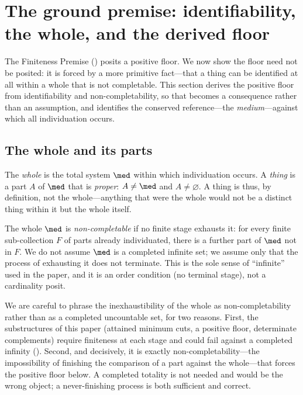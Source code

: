 
\section{The ground premise: identifiability, the whole, and the derived floor}
\label{sec:ground}

The Finiteness Premise () posits a positive floor. We now show
the floor need not be posited: it is forced by a more primitive fact---that a
thing can be identified at all within a whole that is not completable. This
section derives the positive floor from identifiability and non-completability,
so that  becomes a consequence rather than an assumption, and
identifies the conserved reference---the \emph{medium}---against which all
individuation occurs.

\subsection{The whole and its parts}

\begin{definition}
\label{def:whole}
The \emph{whole} is the total system $\med$ within which individuation occurs.
A \emph{thing} is a part $A$ of $\med$ that is \emph{proper}: $A\neq\med$ and
$A\neq\varnothing$. A thing is thus, by definition, not the whole---anything that
were the whole would not be a distinct thing within it but the whole itself.
\end{definition}

\begin{definition}
\label{def:noncompletable}
The whole $\med$ is \emph{non-completable} if no finite stage exhausts it: for
every finite sub-collection $F$ of parts already individuated, there is a further
part of $\med$ not in $F$. We do not assume $\med$ is a completed infinite set;
we assume only that the process of exhausting it does not terminate. This is the
sole sense of ``infinite'' used in the paper, and it is an order condition
\textup{(}no terminal stage\textup{)}, not a cardinality posit.
\end{definition}

\begin{remark}
\label{rem:noncompletable}
We are careful to phrase the inexhaustibility of the whole as
non-completability rather than as a completed uncountable set, for two reasons.
First, the substructures of this paper \textup{(}attained minimum cuts, a
positive floor, determinate complements\textup{)} require finiteness at each
stage and could fail against a completed infinity \textup{(}\textup{)}.
Second, and decisively, it is exactly non-completability---the impossibility of
finishing the comparison of a part against the whole---that forces the positive
floor below. A completed totality is not needed and would be the wrong object; a
never-finishing process is both sufficient and correct.
\end{remark}

